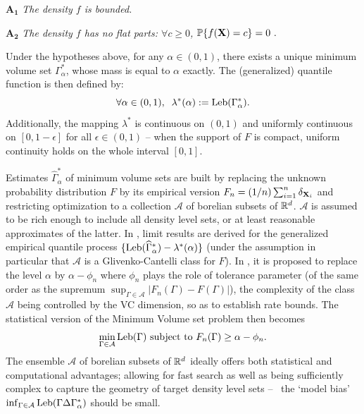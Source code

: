 \noindent $\mathbf{A_1}$ {\it The density $f$ is bounded.}%

\noindent $\mathbf{A_2}$ {\it The density $f$ has no flat parts: $\forall c\geq 0$, $\mathbb{P}\{f(\mathbf X)=c\}=0~.$}

Under the hypotheses above, for any $\alpha\in (0,1)$, there exists a unique minimum volume set $\Gamma_\alpha^*$, whose mass is equal to $\alpha$ exactly.
The (generalized) quantile function is then defined by:
$$
\forall \alpha\in (0,1),\;\; \lambda^*(\alpha) := \text{Leb}(\Gamma^*_{\alpha}).
$$
Additionally, the mapping $\lambda^*$ is continuous on $(0,1)$ and uniformly continuous on $[0,1-\epsilon]$ for all $\epsilon \in (0,1)$ -- when the support of $F$ is compact, uniform continuity holds on the whole interval $[0,1]$.


Estimates $\widehat{\Gamma}^*_{\alpha}$ of minimum volume sets are built by replacing the unknown probability distribution $F$ by its empirical version $F_n=(1/n)\sum_{i=1}^n\delta_{\mathbf X_i}$ and restricting optimization to a collection $\mathcal{A}$ of borelian subsets of $\mathbb{R}^d$.  $\mathcal{A}$ is  assumed to be rich enough to include all density level sets, or at least reasonable approximates of the latter. 
In \cite{Polonik97}, limit results are derived for the generalized empirical quantile process $\{\text{Leb}(\widehat{\Gamma}^*_{\alpha})-\lambda^*(\alpha)\}$ (under the assumption in particular that $\mathcal{A}$ is a Glivenko-Cantelli class for $F$). In \cite{Scott2006}, it is proposed to replace the level $\alpha$ by $\alpha-\phi_n$ where $\phi_n$ plays the role of tolerance parameter (of the same order as the supremum $\sup_{\Gamma\in \mathcal{A}}\vert F_n(\Gamma)-F(\Gamma) \vert$), the complexity of the class $\mathcal{A}$ being controlled by the {\sc VC} dimension, so as to establish rate bounds. The statistical version of the Minimum Volume set problem then becomes
$$
\min_{\Gamma \in \mathcal{A}} \text{Leb}(\Gamma) \mbox{ subject to } F_n (\Gamma) \ge \alpha - \phi_n.
$$
The ensemble $\mathcal{A}$ of borelian subsets of $\mathbb{R}^d$ ideally offers both statistical and computational advantages; allowing for fast search as well as being sufficiently complex to capture the geometry of target density level sets -- \ie~the `model bias' $\inf_{\Gamma \in \mathcal{A}} \text{Leb}(\Gamma \Delta \Gamma^*_\alpha )$ should be small.

